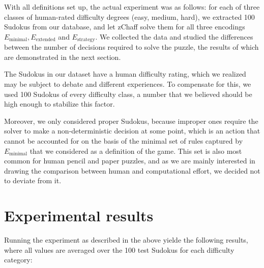 \documentclass[10pt,a4paper,leqno]{article}
\begin{document}
With all definitions set up, the actual experiment was as follows: for each of three classes of human-rated difficulty degrees (easy, medium, hard), we extracted 100 Sudokus from our database, and let zChaff solve them for all three encodings $E_{\text{minimal}}, E_{\text{extended}} $ and $E_{\text{strategy}} $. We collected the data and studied the differences between the number of decisions required to solve the puzzle, the results of which are demonstrated in the next section. 

The Sudokus in our dataset have a human difficulty rating, which we realized may be subject to debate and different experiences. To compensate for this, we used 100 Sudokus of every difficulty class, a number that we believed should be high enough to stabilize this factor. 

Moreover, we only considered proper Sudokus, because improper ones require the solver to make a non-deterministic decision at some point, which is an action that cannot be accounted for on the basis of the minimal set of rules captured by $E_{\text{minimal}}$ that we considered as a definition of the game. This set is also most common for human pencil and paper puzzles, and as we are mainly interested in drawing the comparison between human and computational effort, we decided not to deviate from it. 



\section*{Experimental results}

 
Running the experiment as described in the above yielde the following results, where all values are averaged over the 100 test Sudokus for each difficulty category:
\end{document}
